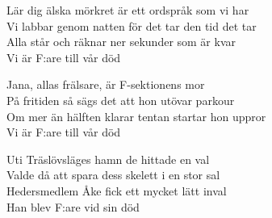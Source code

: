\begin{vers}
Lär dig älska mörkret är ett ordspråk som vi har\\
Vi labbar genom natten för det tar den tid det tar\\
Alla står och räknar ner sekunder som är kvar\\
Vi är F:are till vår död
\end{vers}

\begin{vers}
Jana, allas frälsare, är F-sektionens mor\\
På fritiden så sägs det att hon utövar parkour\\
Om mer än hälften klarar tentan startar hon uppror\\
Vi är F:are till vår död \\
\end{vers}

\begin{vers}
Uti Träslövsläges hamn de hittade en val\\
Valde då att spara dess skelett i en stor sal\\
Hedersmedlem Åke fick ett mycket lätt inval\\
Han blev F:are vid sin död\\
\end{vers}

\fi

